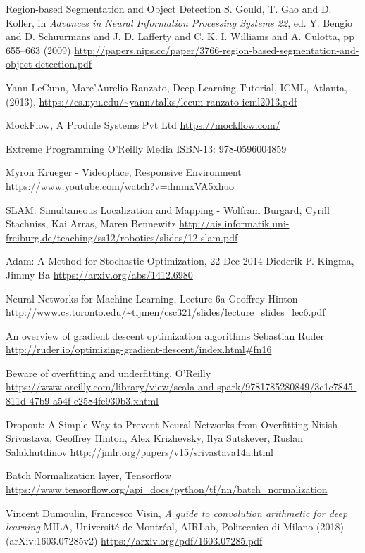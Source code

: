 \begin{thebibliography}{X}
Region-based Segmentation and Object Detection
S. Gould, T. Gao and D. Koller, in \textit{Advances in Neural Information Processing Systems 22}, 
ed. Y. Bengio and D. Schuurmans and J. D. Lafferty 
and C. K. I. Williams and A. Culotta, 
pp 655--663
(2009)
\url{http://papers.nips.cc/paper/3766-region-based-segmentation-and-object-detection.pdf}

Yann LeCunn, Marc'Aurelio Ranzato, Deep Learning Tutorial, ICML, Atlanta, (2013), 
\url{https://cs.nyu.edu/~yann/talks/lecun-ranzato-icml2013.pdf}

MockFlow,  A Produle Systems Pvt Ltd 
 \url{https://mockflow.com/}

Extreme Programming
O'Reilly Media
ISBN-13: 978-0596004859

Myron Krueger - Videoplace, Responsive Environment
\url{https://www.youtube.com/watch?v=dmmxVA5xhuo}


SLAM: Simultaneous Localization and Mapping - Wolfram Burgard, Cyrill Stachniss, Kai Arras, Maren Bennewitz
\url{http://ais.informatik.uni-freiburg.de/teaching/ss12/robotics/slides/12-slam.pdf}

Adam: A Method for Stochastic Optimization, 22 Dec 2014
Diederik P. Kingma, Jimmy Ba
\url{https://arxiv.org/abs/1412.6980}

Neural Networks for Machine Learning, Lecture 6a
Geoffrey Hinton
\url{http://www.cs.toronto.edu/~tijmen/csc321/slides/lecture_slides_lec6.pdf}

An overview of gradient descent optimization algorithms
Sebastian Ruder
\url{http://ruder.io/optimizing-gradient-descent/index.html#fn16}

Beware of overfitting and underfitting, O'Reilly
\url{https://www.oreilly.com/library/view/scala-and-spark/9781785280849/3c1c7845-811d-47b9-a54f-c2584fe930b3.xhtml}

Dropout: A Simple Way to Prevent Neural Networks from Overfitting
Nitish Srivastava, Geoffrey Hinton, Alex Krizhevsky, Ilya Sutskever, Ruslan Salakhutdinov
\url{http://jmlr.org/papers/v15/srivastava14a.html}

Batch Normalization layer, Tensorflow
\url{https://www.tensorflow.org/api_docs/python/tf/nn/batch_normalization}

Vincent Dumoulin, Francesco Visin, \textit{A guide to convolution arithmetic for deep learning}
 MILA, Universit\'e de Montr\'eal,
AIRLab, Politecnico di Milano (2018)
(arXiv:1603.07285v2)
\url{https://arxiv.org/pdf/1603.07285.pdf}


\end{thebibliography}
